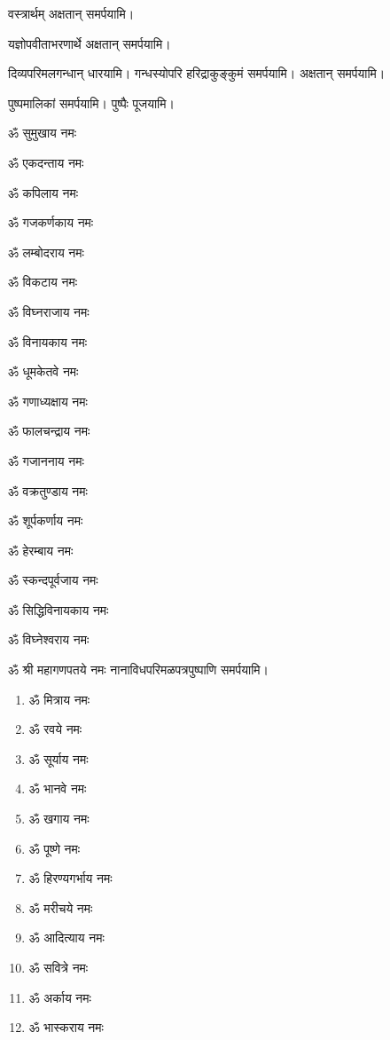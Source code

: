 \begin{center}
वस्त्रार्थम् अक्षतान् समर्पयामि।

यज्ञोपवीताभरणार्थे अक्षतान् समर्पयामि।

दिव्यपरिमलगन्धान् धारयामि। गन्धस्योपरि हरिद्राकुङ्कुमं समर्पयामि। अक्षतान् समर्पयामि।

पुष्पमालिकां समर्पयामि। पुष्पैः पूजयामि।


\begin{enumerate}%
\begin{minipage}{0.475\linewidth} 
\item ॐ सुमुखाय नमः
\item ॐ एकदन्ताय नमः
\item ॐ कपिलाय नमः
\item ॐ गजकर्णकाय नमः
\item ॐ लम्बोदराय नमः
\item ॐ विकटाय नमः
\item ॐ विघ्नराजाय नमः
\item ॐ विनायकाय नमः
\item ॐ धूमकेतवे नमः
\end{minipage}
\begin{minipage}{0.525\linewidth}
\item ॐ गणाध्यक्षाय नमः
\item ॐ फालचन्द्राय नमः
\item ॐ गजाननाय नमः
\item ॐ वक्रतुण्डाय नमः
\item ॐ शूर्पकर्णाय नमः
\item ॐ हेरम्बाय नमः
\item ॐ स्कन्दपूर्वजाय नमः
\item ॐ सिद्धिविनायकाय नमः
\item ॐ विघ्नेश्वराय नमः
\end{minipage}
\end{enumerate}

ॐ श्री महागणपतये नमः नानाविधपरिमळपत्रपुष्पाणि समर्पयामि। \medskip

\begin{multicols}{2}
\begin{enumerate}
\item ॐ मित्राय नमः
\item ॐ रवये नमः
\item ॐ सूर्याय नमः
\item ॐ भानवे नमः
\item ॐ खगाय नमः
\item ॐ पूष्णे नमः
\item ॐ हिरण्यगर्भाय नमः
\item ॐ मरीचये नमः
\item ॐ आदित्याय नमः
\item ॐ सवित्रे नमः
\item ॐ अर्काय नमः
\item ॐ भास्कराय नमः


\end{enumerate}
\end{multicols}
\end{center}
